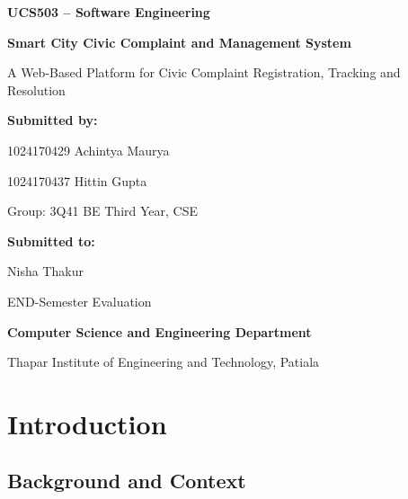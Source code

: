 \documentclass[12pt,a4paper]{report}
\begin{document}
\begin{titlepage}
\centering
\vspace*{0.8in}
{\Large\bfseries UCS503 -- Software Engineering\par}
\vspace{0.3in}
{\LARGE\bfseries Smart City Civic Complaint and Management System\par}
\vspace{0.25in}
{\large A Web-Based Platform for Civic Complaint Registration, Tracking and Resolution\par}
\vspace{0.8in}
\textbf{Submitted by:}\par
\vspace{0.15in}
1024170429 Achintya Maurya\par
1024170437 Hittin Gupta\par
\vspace{0.3in}
Group: 3Q41 BE Third Year, CSE\par
\vspace{0.6in}
\textbf{Submitted to:}\par
\vspace{0.15in}
Nisha Thakur\par
\vfill
END-Semester Evaluation\par
\textbf{Computer Science and Engineering Department}\par
Thapar Institute of Engineering and Technology, Patiala\par
\end{titlepage}

\tableofcontents
\clearpage
\listoffigures
\clearpage
\listoftables
\clearpage

\chapter{Introduction}

\section{Background and Context}
\end{document}
